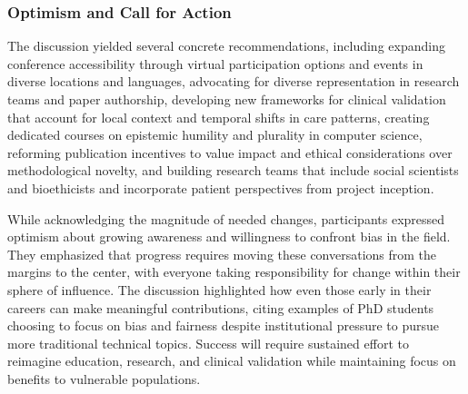 \subsubsection{Optimism and Call for Action}
The discussion yielded several concrete recommendations, including expanding conference accessibility through virtual participation options and events in diverse locations and languages, advocating for diverse representation in research teams and paper authorship, developing new frameworks for clinical validation that account for local context and temporal shifts in care patterns, creating dedicated courses on epistemic humility and plurality in computer science, reforming publication incentives to value impact and ethical considerations over methodological novelty, and building research teams that include social scientists and bioethicists and incorporate patient perspectives from project inception.

While acknowledging the magnitude of needed changes, participants expressed optimism about growing awareness and willingness to confront bias in the field. They emphasized that progress requires moving these conversations from the margins to the center, with everyone taking responsibility for change within their sphere of influence. The discussion highlighted how even those early in their careers can make meaningful contributions, citing examples of PhD students choosing to focus on bias and fairness despite institutional pressure to pursue more traditional technical topics. Success will require sustained effort to reimagine education, research, and clinical validation while maintaining focus on benefits to vulnerable populations. 



